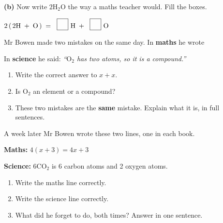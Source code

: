 \documentclass[12pt,a4paper]{article}
\newcommand{\qlines}[1]{\par\needspace{\numexpr#1+1\relax\baselineskip}\wlines{#1}}
\newcommand{\ch}[1]{\ensuremath{\mathrm{#1}}}
\newcommand{\nbox}{\ \fbox{\rule{0pt}{1.05em}\rule{1.0em}{0pt}}\ }
\begin{document}
\vspace{7pt}
\noindent \textbf{(b)} Now write \ch{2H_2O} the way a maths teacher would. Fill the boxes.

\vspace{4pt}
\noindent\hspace*{1.2em}$2\,(\,2\ch{H} \;+\; \ch{O}\,) \;=\; \nbox \ch{H} \;+\; \nbox \ch{O}$


\noindent Mr Bowen made two mistakes on the same day. In \textbf{maths} he wrote
\; 

\vspace{4pt}
\noindent In \textbf{science} he said: \quad
\emph{``\ch{O_2} has two atoms, so it is a compound.''}

\vspace{4pt}
\begin{enumerate}[label=(\alph*), itemsep=6pt]
  \item Write the correct answer to $x + x$. \hfill \blank[4.0cm]
  \item Is \ch{O_2} an element or a compound? \hfill \blank[4.0cm]
  \item These two mistakes are the \textbf{same} mistake. Explain what it is, in
        full sentences.
\end{enumerate}
\qlines{3}


\noindent A week later Mr Bowen wrote these two lines, one in each book.

\vspace{4pt}
\noindent \hspace*{1.2em}\textbf{Maths:} \quad $4(x + 3) = 4x + 3$

\vspace{3pt}
\noindent \hspace*{1.2em}\textbf{Science:} \quad \ch{6CO_2} is 6 carbon atoms and 2
oxygen atoms.

\vspace{4pt}
\begin{enumerate}[label=(\alph*), itemsep=6pt]
  \item Write the maths line correctly. \hfill \blank[4.6cm]
  \item Write the science line correctly. \hfill \blank[4.6cm]
  \item What did he forget to do, both times? Answer in one sentence.
\end{enumerate}
\qlines{2}
\end{document}
